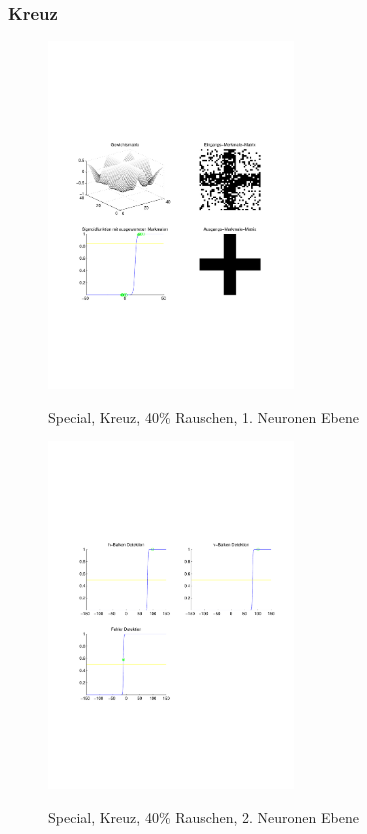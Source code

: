 \subsubsection{Kreuz}
\begin{figure}[hbt]
	\begin{minipage}[c]{\textwidth}
		\centering
       	\includegraphics[trim=71 213 43 212, clip, width=0.58\textwidth]{./Bilder/Auswertung/Endergebnis/TypeSpecial_Rauschen40_Cross_Layer1}
		\caption{Special, Kreuz, 40\% Rauschen, 1. Neuronen Ebene}
		\label{Special_Kreuz_40_1}
		\vfill
		\includegraphics[trim=71 213 43 212, clip, width=0.58\textwidth]{./Bilder/Auswertung/Endergebnis/TypeSpecial_Rauschen40_Cross_Layer2}
		\caption{Special, Kreuz, 40\% Rauschen, 2. Neuronen Ebene}
		\label{Special_Kreuz_40_2}
	\end{minipage}
\end{figure}

